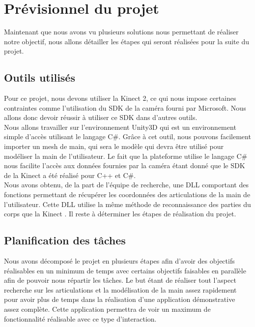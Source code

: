 \chapter{Prévisionnel du projet}
Maintenant que nous avons vu plusieurs solutions nous permettant de réaliser notre 
objectif, nous allons détailler les étapes qui seront réalisées pour la suite du projet.

\section{Outils utilisés}
Pour ce projet, nous devons utiliser la Kinect 2, ce qui nous impose certaines contraintes comme l'utilisation
du SDK de la caméra fourni par Microsoft. Nous allons donc devoir réussir à utiliser ce SDK dans d'autres outils.\\

Nous allons travailler sur l'environnement Unity3D qui est 
un environnement simple d'accès utilisant le langage C\#. Grâce à cet outil, nous pouvons
facilement importer un mesh de main, qui sera le modèle qui devra être utilisé pour modéliser
la main de l'utilisateur. Le fait que la plateforme utilise le langage C\# nous facilite 
l'accès aux données fournies par la caméra étant donné que le SDK de la Kinect a été réalisé pour
C++ et C\#.\\

Nous avons obtenu, de la part de l'équipe de recherche, une DLL comportant des fonctions permettant
de récupérer les coordonnées des articulations de la main de l'utilisateur. Cette DLL utilise 
la même méthode de reconnaissance des parties du corps que la Kinect \cite{export:145347}. Il reste à déterminer les 
étapes de réalisation du projet.

\section{Planification des tâches}
Nous avons décomposé le projet en plusieurs étapes afin d'avoir des objectifs réalisables en 
un minimum de temps avec certains objectifs faisables en parallèle afin de pouvoir nous répartir
les tâches. Le but étant de réaliser tout l'aspect recherche sur les articulations et la modélisation de la main assez rapidement pour 
avoir plus de temps dans la réalisation d'une application démonstrative assez complète. Cette application
permettra de voir un maximum de fonctionnalité réalisable avec ce type d'interaction.\\

